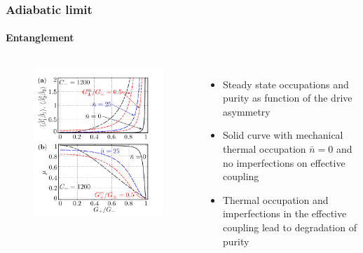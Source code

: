 \documentclass[aspectratio=43]{beamer}
\begin{document}
\begin{frame}
	
	\frametitle{Adiabatic limit}
	\framesubtitle{Entanglement}
	
	\begin{columns}
		
		
		\begin{figure}
			\includegraphics[width = 6 cm]{plots/plot_steady_state.png}
		\end{figure}	
		
		
		\begin{itemize}
			\item Steady state occupations and purity as function of the drive asymmetry
			\item Solid curve with mechanical thermal occupation $\bar{n} = 0$ and no imperfections on effective coupling
			\item Thermal occupation and imperfections in the effective coupling lead to degradation of purity
		\end{itemize}
		
	\end{columns}

\end{frame}
\end{document}
